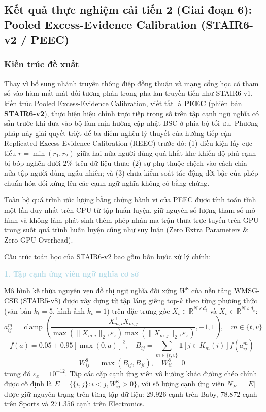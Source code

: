 \subsection{Kết quả thực nghiệm cải tiến 2 (Giai đoạn 6): Pooled Excess-Evidence Calibration (STAIR6-v2 / PEEC)}

\subsubsection{Kiến trúc đề xuất}

Thay vì bổ sung nhánh truyền thông điệp đồng thuận và mạng cổng học có tham số vào hàm mất mát đối tương phản trong pha lan truyền tiến như STAIR6-v1, kiến trúc Pooled Excess-Evidence Calibration, viết tắt là \textbf{PEEC} (phiên bản \textbf{STAIR6-v2}), thực hiện hiệu chỉnh trực tiếp trọng số trên tập cạnh ngữ nghĩa có sẵn trước khi đưa vào bộ làm mịn hướng cập nhật BSC ở phía bộ tối ưu. Phương pháp này giải quyết triệt để ba điểm nghẽn lý thuyết của hướng tiếp cận Replicated Excess-Evidence Calibration (REEC) trước đó: (1) điều kiện lấy cực tiểu $r = \min(r_1, r_2)$ giữa hai nửa người dùng quá khắt khe khiến độ phủ cạnh bị bóp nghẽn dưới $2\%$ trên dữ liệu thưa; (2) sự phụ thuộc chệch vào cách chia nửa tập người dùng ngẫu nhiên; và (3) chưa kiểm soát tác động dời bậc của phép chuẩn hóa đối xứng lên các cạnh ngữ nghĩa không có bằng chứng.

Toàn bộ quá trình ước lượng bằng chứng hành vi của PEEC được tính toán tĩnh một lần duy nhất trên CPU từ tập huấn luyện, giữ nguyên số lượng tham số mô hình và không làm phát sinh thêm phép nhân ma trận thưa trực tuyến trên GPU trong suốt quá trình huấn luyện cũng như suy luận (Zero Extra Parameters \& Zero GPU Overhead).

Cấu trúc toán học của STAIR6-v2 bao gồm bốn bước xử lý chính:

\noindent\textcolor{lightblue}{\textbf{1. Tập cạnh ứng viên ngữ nghĩa cơ sở}}

Mô hình kế thừa nguyên vẹn đồ thị ngữ nghĩa đối xứng $W^8$ của nền tảng WMSG-CSE (STAIR5-v8) được xây dựng từ tập láng giềng top-$k$ theo từng phương thức (văn bản $k_t = 5$, hình ảnh $k_v = 1$) trên đặc trưng gốc $X_t \in \mathbb{R}^{N \times d_t}$ và $X_v \in \mathbb{R}^{N \times d_v}$:
\begin{equation}
a_{ij}^m = \operatorname{clamp}\left( \frac{X_{m,i}^\top X_{m,j}}{\max(\|X_{m,i}\|_2, \varepsilon_x) \max(\|X_{m,j}\|_2, \varepsilon_x)}, -1, 1 \right), \quad m \in \{t, v\}
\end{equation}
\begin{equation}
f(a) = 0.05 + 0.95[\max(0, a)]^2, \quad B_{ij} = \sum_{m \in \{t, v\}} \mathbf{1}[j \in K_m(i)] f(a_{ij}^m)
\end{equation}
\begin{equation}
W_{ij}^8 = \max(B_{ij}, B_{ji}), \quad W_{ii}^8 = 0
\end{equation}
trong đó $\varepsilon_x = 10^{-12}$. Tập các cặp cạnh ứng viên vô hướng khác đường chéo chính được cố định là $E = \{\{i, j\} : i < j, W_{ij}^8 > 0\}$, với số lượng cạnh ứng viên $N_E = |E|$ được giữ nguyên trạng trên từng tập dữ liệu: $29.926$ cạnh trên Baby, $78.872$ cạnh trên Sports và $271.356$ cạnh trên Electronics.

